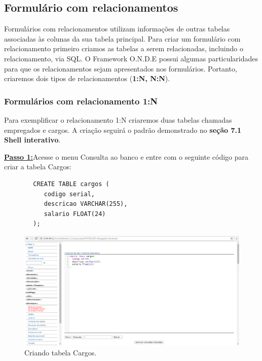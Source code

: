 \documentclass[9pt]{report}
\begin{document}
{      \subsection{Formulário com relacionamentos}
      
      Formulários com relacionamentos utilizam informações de outras tabelas
      associadas às colunas da sua tabela principal. Para criar um formulário
      com relacionamento primeiro criamos as tabelas a serem relacionadas,
      incluindo o relacionamento, via SQL. O Framework O.N.D.E possui algumas
      particularidades para que os relacionamentos sejam apresentados nos
      formulários. Portanto, criaremos dois tipos de relacionamentos
      (\textbf{1:N, N:N}).
      
      \subsubsection{Formulários com relacionamento 1:N}
      
      Para exemplificar o relacionamento 1:N criaremos duas tabelas
      chamadas empregados e cargos. A criação seguirá o padrão
      demonstrado no \textbf{seção 7.1 Shell interativo}.

      \underline{\textbf{Passo 1:}}Acesse o menu Consulta ao banco e
      entre com o seguinte código para criar a tabela Cargos:

      \begin{lstlisting}
        CREATE TABLE cargos (
           codigo serial,
           descricao VARCHAR(255),
           salario FLOAT(24)
        );
      \end{lstlisting}

      \begin{figure}[H]
        \includegraphics[width=\textwidth]{2_Formularios/3_Relacionamento_1_N/26.png}
        \caption{Criando tabela Cargos.}
        \label{fig:criatablecargos}
      \end{figure}

}
\end{document}
